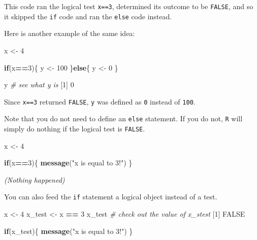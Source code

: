 \documentclass[
]{book}
\newenvironment{Shaded}{\begin{snugshade}}{\end{snugshade}}
\newcommand{\CommentTok}[1]{\textcolor[rgb]{0.56,0.35,0.01}{\textit{#1}}}
\newcommand{\ControlFlowTok}[1]{\textcolor[rgb]{0.13,0.29,0.53}{\textbf{#1}}}
\newcommand{\DecValTok}[1]{\textcolor[rgb]{0.00,0.00,0.81}{#1}}
\newcommand{\KeywordTok}[1]{\textcolor[rgb]{0.13,0.29,0.53}{\textbf{#1}}}
\newcommand{\NormalTok}[1]{#1}
\newcommand{\OperatorTok}[1]{\textcolor[rgb]{0.81,0.36,0.00}{\textbf{#1}}}
\newcommand{\OtherTok}[1]{\textcolor[rgb]{0.56,0.35,0.01}{#1}}
\newcommand{\StringTok}[1]{\textcolor[rgb]{0.31,0.60,0.02}{#1}}
\begin{document}
This code ran the logical test \texttt{x==3}, determined its outcome to be \texttt{FALSE}, and so it skipped the \texttt{if} code and ran the \texttt{else} code instead.

Here is another example of the same idea:

\begin{Shaded}
\begin{Highlighting}[]
\NormalTok{x <-}\StringTok{ }\DecValTok{4}

\ControlFlowTok{if}\NormalTok{(x}\OperatorTok{==}\DecValTok{3}\NormalTok{)\{}
\NormalTok{  y <-}\StringTok{ }\DecValTok{100}
\NormalTok{\}}\ControlFlowTok{else}\NormalTok{\{}
\NormalTok{  y <-}\StringTok{ }\DecValTok{0}
\NormalTok{\}}

\NormalTok{y }\CommentTok{# see what y is}
\NormalTok{[}\DecValTok{1}\NormalTok{] }\DecValTok{0}
\end{Highlighting}
\end{Shaded}

Since \texttt{x==3} returned \texttt{FALSE}, \texttt{y} was defined as \texttt{0} instead of \texttt{100}.

Note that you do not need to define an \texttt{else} statement. If you do not, \texttt{R} will simply do nothing if the logical test is \texttt{FALSE}.

\begin{Shaded}
\begin{Highlighting}[]
\NormalTok{x <-}\StringTok{ }\DecValTok{4}

\ControlFlowTok{if}\NormalTok{(x}\OperatorTok{==}\DecValTok{3}\NormalTok{)\{}
  \KeywordTok{message}\NormalTok{(}\StringTok{"x is equal to 3!"}\NormalTok{)}
\NormalTok{\}}
\end{Highlighting}
\end{Shaded}

\emph{(Nothing happened)}

You can also feed the \texttt{if} statement a logical object instead of a test.

\begin{Shaded}
\begin{Highlighting}[]
\NormalTok{x <-}\StringTok{ }\DecValTok{4}
\NormalTok{x_test <-}\StringTok{ }\NormalTok{x }\OperatorTok{==}\StringTok{ }\DecValTok{3}
\NormalTok{x_test }\CommentTok{# check out the value of x_stest}
\NormalTok{[}\DecValTok{1}\NormalTok{] }\OtherTok{FALSE}

\ControlFlowTok{if}\NormalTok{(x_test)\{}
  \KeywordTok{message}\NormalTok{(}\StringTok{"x is equal to 3!"}\NormalTok{)}
\NormalTok{\}}
\end{Highlighting}
\end{Shaded}
\end{document}
